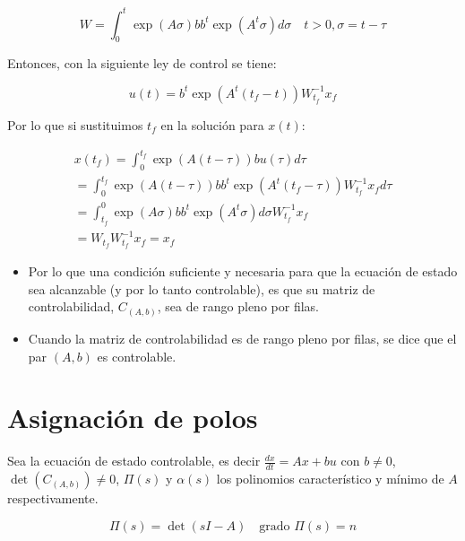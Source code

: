         \begin{equation}
            W = \int_0^t \exp{(A \sigma)} b b^t \exp{(A^t \sigma)} d\sigma \quad t > 0, \sigma = t - \tau
        \end{equation}

        Entonces, con la siguiente ley de control se tiene:

        \begin{equation}
            u(t) = b^t \exp{(A^t(t_f - t))} W_{t_f}^{-1} x_f
        \end{equation}

        Por lo que si sustituimos $t_f$ en la solución para $x(t)$:

        \begin{multline}
            x(t_f) = \int_0^{t_f} \exp{(A(t - \tau))} b u(\tau) d\tau \\
                   = \int_0^{t_f} \exp{(A(t - \tau))} b b^t \exp{(A^t(t_f - \tau))} W_{t_f}^{-1} x_f d\tau \\
                   = \int_{t_f}^0 \exp{(A \sigma)} b b^t \exp{(A^t \sigma)} d\sigma W_{t_f}^{-1} x_f \\
                   = W_{t_f} W_{t_f}^{-1} x_f = x_f
        \end{multline}

        \begin{itemize}
            \item Por lo que una condición suficiente y necesaria para que la ecuación de estado sea alcanzable (y por lo tanto controlable), es que su matriz de controlabilidad, $C_{(A,b)}$, sea de rango pleno por filas.
            \item Cuando la matriz de controlabilidad es de rango pleno por filas, se dice que el par $(A, b)$ es controlable.
        \end{itemize}

    \section{Asignación de polos}

        Sea la ecuación de estado controlable, es decir $\frac{dx}{dt} = Ax + bu$ con $b \ne 0$, $\det{(C_{(A,b)})} \ne 0$, $\Pi(s)$ y $\alpha(s)$ los polinomios característico y mínimo de $A$ respectivamente.

        \begin{equation}
            \Pi(s) = \det{(sI - A)} \quad \text{grado } \Pi(s) = n \nonumber
        \end{equation}

